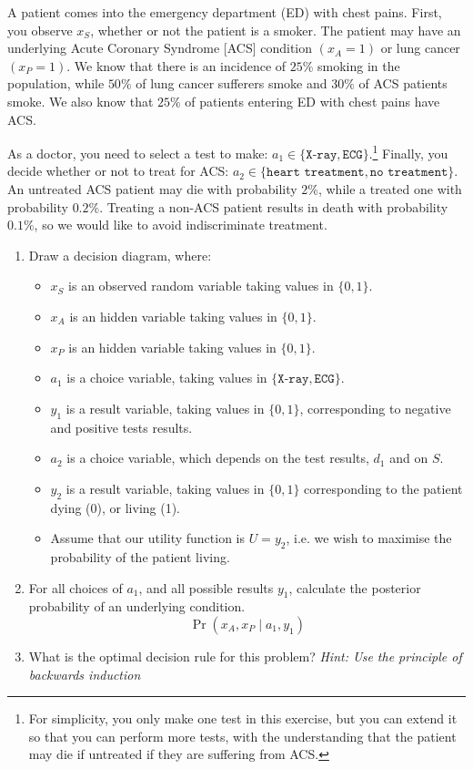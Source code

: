 \documentclass[twoside,a4paper]{article}
\begin{document}
\begin{exercise}
  A patient comes into the emergency department (ED) with chest pains.  First, you observe $x_S$, whether or not the patient is a smoker. The patient may have an underlying Acute Coronary Syndrome [ACS] condition $(x_A = 1)$ or lung cancer $(x_P = 1)$. We know that there is an incidence of $25\%$ smoking in the population, while $50\%$ of lung cancer sufferers smoke and $30\%$ of ACS patients smoke. We also know that $25\%$ of patients entering ED with chest pains have ACS. 

  As a doctor, you need to select a test to make:
  $a_1 \in \{\texttt{X-ray}, \texttt{ECG}\}$.\footnote{For simplicity,
    you only make one test in this exercise, but you can extend it so
    that you can perform more tests, with the understanding that the patient may die if untreated if they are suffering from ACS.}  Finally, you decide whether or
not to treat for ACS:
$a_2 \in \{\texttt{heart treatment}, \texttt{no treatment}\}$. An
untreated ACS patient may die with probability $2\%$, while a treated
one with probability $0.2\%$. Treating a non-ACS patient results in
death with probability $0.1\%$, so we would like to avoid indiscriminate treatment.
  \begin{enumerate}
  \item Draw a decision diagram, where:
    \begin{itemize}
    \item $x_S$ is an observed random variable taking values in $\{0, 1\}$.
    \item $x_A$ is an hidden variable taking values in $\{0, 1\}$.
    \item $x_P$ is an hidden variable taking values in $\{0, 1\}$.
    \item $a_1$ is a choice variable, taking values in $\{\texttt{X-ray}, \texttt{ECG}\}$. 
    \item $y_1$ is a result variable, taking values in
      $\{0, 1\}$, corresponding to negative and positive tests results.
    \item $a_2$ is a choice variable, which depends on the test results, $d_1$ and on $S$.
    \item $y_2$ is a result variable, taking values in $\{0,1\}$ corresponding to the patient dying (0), or living (1).
    \item Assume that our utility function is $U = y_2$, i.e. we wish to maximise the probability of the patient living.
    \end{itemize}
  \item For all choices of $a_1$, and all possible results $y_1$, calculate the posterior probability of an underlying condition.
    \[
      \Pr(x_A, x_P \mid a_1, y_1)
    \]
  \item What is the optimal decision rule for this problem? \emph{Hint: Use the principle of backwards induction}
  \end{enumerate}
  \label{ex:diagnostic-test}
\end{exercise}
\end{document}
